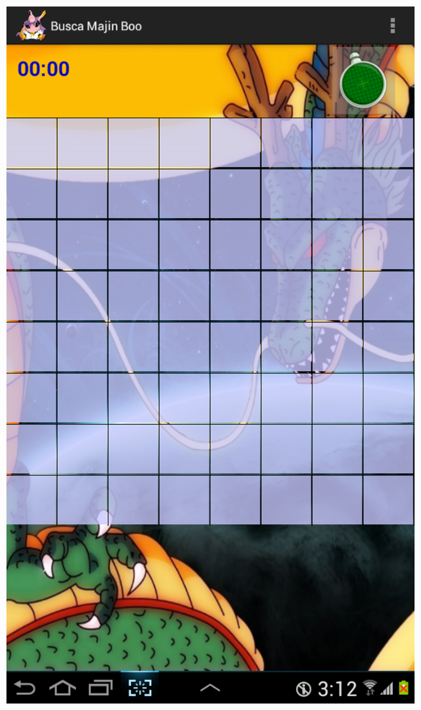 \documentclass[11pt]{article} %
\begin{document}
\begin{itemize}
\begin{center}
\includegraphics[scale=0.2]{Imagenes/SSNormal.png}

\end{center}
\end{itemize}
\end{document}
